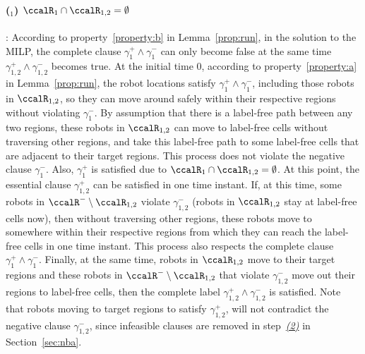 \documentclass[Afour,sageh,times]{sagej}
\newcounter{mycounter}
\begin{document}
{{\paragraph{ ($_1$) $\ccalR_1 \cap \ccalR_{1,2} = \emptyset$}\label{app:gmrpp_a}: According to property~\ref{property:b} in Lemma~\ref{prop:run}, in the solution to the MILP, the complete clause $\gamma_1^+ \wedge \gamma_1^-$ can only become false at the same time $\gamma_{1,2}^+ \wedge \gamma_{1,2}^-$ becomes true. At the initial time 0, according  to property~\ref{property:a} in Lemma~\ref{prop:run}, the robot locations satisfy $\gamma_1^+ \wedge \gamma_1^-$, including those robots in $\ccalR_{1,2}$, so  they can move around safely  within their respective regions without violating $\gamma_1^-$. By assumption that there is a label-free path between any two regions, these robots in $\ccalR_{1,2}$ can move to label-free cells without traversing other regions, and take this label-free path to  some label-free cells that are adjacent to their target regions. This process does not  violate  the negative clause $\gamma_1^-$. Also, $\gamma_1^+$ is satisfied due to $\ccalR_1 \cap \ccalR_{1,2} = \emptyset$. At this point, the essential clause $\gamma_{1,2}^+$ can be satisfied in one  time instant. If, at this time, some robots in $\ccalR^-\setminus \ccalR_{1,2}$ violate $\gamma_{1,2}^-$ (robots in $\ccalR_{1,2}$ stay at label-free cells now), then without traversing other regions, these robots  move to somewhere within their respective regions from which they can reach the label-free cells in one time instant. This process also respects the complete clause $\gamma_1^+ \wedge \gamma_1^-$. Finally, at the same time, robots in $\ccalR_{1,2}$ move to their target regions and these robots in $\ccalR^-\setminus \ccalR_{1,2}$ that violate $\gamma_{1,2}^-$   move out their regions to label-free cells, then the complete label $\gamma_{1,2}^+ \wedge \gamma_{1,2}^-$ is satisfied. Note that robots moving to target regions to satisfy $\gamma_{1,2}^+$, will not contradict the negative clause $\gamma_{1,2}^-$, since infeasible clauses are removed in step~\hyperref[prune:exclusion2]{\it (2)} in Section~\ref{sec:nba}.


}}
\end{document}
